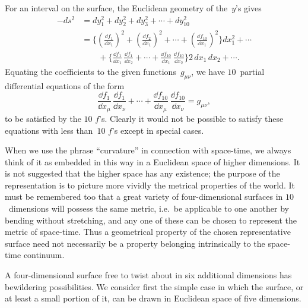 \documentclass[12pt]{book}
\begin{document}
For an interval on the surface, the Euclidean geometry of the~$y$'s gives
\begin{align*}
  -ds^{2}
  &= dy_{1}^{2} + dy_{2}^{2} + dy_{3}^{2} + \cdots + dy_{10}^{2} \\
  &= \biggl\{\left(\frac{\dd f_{1}}{\dd x_{1}}\right)^{2}
  + \left(\frac{\dd f_{2}}{\dd x_{1}}\right)^{2} + \cdots
  + \left(\frac{\dd f_{10}}{\dd x_{1}}\right)^{2}\biggr\} dx_{1}^{2} + \cdots \\
  &\qquad + \biggl\{\frac{\dd f_{1}}{\dd x_{1}}\, \frac{\dd f_{1}}{\dd x_{2}}
  + \cdots + \frac{\dd f_{10}}{\dd x_{1}}\, \frac{\dd f_{10}}{\dd x_{2}}\biggr\}
  2\, dx_{1}\, dx_{2} + \cdots.
\end{align*}
Equating the coefficients to the given functions~$g_{\mu\nu}$, we have $10$~partial differential
equations of the form
\[
\frac{\dd f_{1}}{\dd x_{\mu}}\, \frac{\dd f_{1}}{\dd x_{\nu}}
+ \cdots + \frac{\dd f_{10}}{\dd x_{\mu}}\, \frac{\dd f_{10}}{\dd x_{\nu}}
= g_{\mu\nu},
\]
to be satisfied by the $10$ $f$'s. Clearly it would not be possible to satisfy these
equations with less than~$10$ $f$'s except in special cases.

When we use the phrase ``curvature'' in connection with space-time, we
always think of it as embedded in this way in a Euclidean space of higher
dimensions. It is not suggested that the higher space has any existence; the
purpose of the representation is to picture more vividly the metrical properties
of the world. It must be remembered too that a great variety of
four-dimensional surfaces in $10$~dimensions will possess the same metric, i.e.\ be
applicable to one another by bending without stretching, and any one of these
can be chosen to represent the metric of space-time. Thus a geometrical property
of the chosen representative surface need not necessarily be a property
belonging intrinsically to the space-time continuum.

A four-dimensional surface free to twist about in six additional dimensions
has bewildering possibilities. We consider first the simple case in which the
surface, or at least a small portion of it, can be drawn in Euclidean space of
five dimensions.
\end{document}
